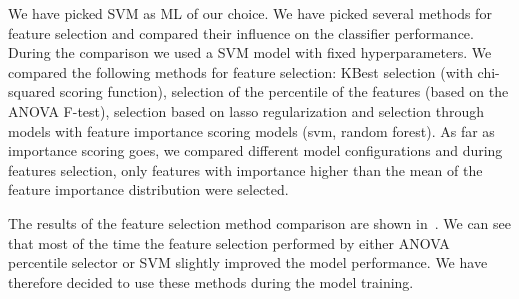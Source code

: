 We have picked SVM as ML of our choice. We have picked several methods for feature
selection and compared their influence on the classifier performance. During the comparison
we used a SVM model with fixed hyperparameters. We compared the following methods for
feature selection: KBest selection (with chi-squared scoring function), selection of the percentile
of the features (based on the ANOVA F-test),
selection based on lasso regularization and selection through models with feature importance
scoring models (svm, random forest). As far as importance scoring goes, we compared different
model configurations and during features selection, only features with importance higher
than the mean of the feature importance distribution were selected.

The results of the feature selection method comparison are shown in~. We can see
that most of the time the feature selection performed by either ANOVA percentile selector or
SVM slightly improved the model performance. We have therefore decided to use these methods during
the model training.

